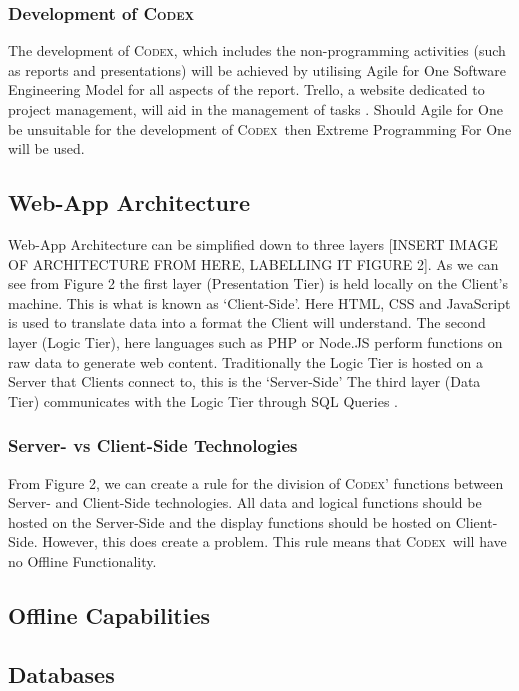 \documentclass[review]{cmpreport}
\newcommand{\Codex}{\textsc{Codex}}
\begin{document}
	\subsubsection{Development of \Codex}
	The development of \Codex, which includes the non-programming activities (such as reports and presentations) will be achieved by utilising Agile for One Software Engineering Model for all aspects of the report. Trello, a website dedicated to project management, will aid in the management of tasks \citep{Trello}. Should Agile for One be unsuitable for the development of \Codex \ then Extreme Programming For One will be used. 
	
	\subsection{Web-App Architecture} \label{Web-Arch}
	Web-App Architecture can be simplified down to three layers [INSERT IMAGE OF ARCHITECTURE FROM \citep{SecurityWebApps} HERE, LABELLING IT FIGURE 2]. As we can see from Figure 2 the first layer (Presentation Tier) is held locally on the Client's machine. This is what is known as `Client-Side'. Here HTML, CSS and JavaScript is used to translate data into a format the Client will understand. The second layer (Logic Tier), here languages such as PHP or Node.JS perform functions on raw data to generate web content. Traditionally the Logic Tier is hosted on a Server that Clients connect to, this is the `Server-Side' The third layer (Data Tier) communicates with the Logic Tier through SQL Queries \citep{SecurityWebApps}.
	
	\subsubsection{Server- vs Client-Side Technologies}
	From Figure 2, we can create a rule for the division of \Codex' functions between Server- and Client-Side technologies. All data and logical functions should be hosted on the Server-Side and the display functions should be hosted on Client-Side. However, this does create a problem. This rule means that \Codex \ will have no Offline Functionality. 
	
	\subsection{Offline Capabilities} \label{Offline}
	

	\subsection{Databases} \label{Database}
\end{document}
